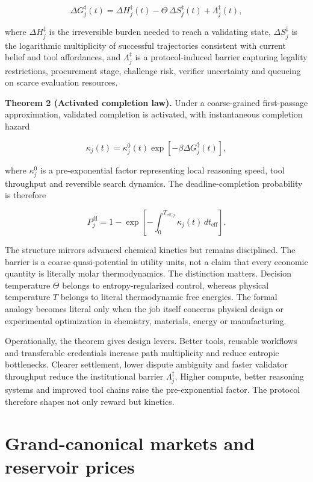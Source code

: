 \[
\Delta G_j^{\ddagger}(t) = \Delta H_j^{\ddagger}(t) - \Theta\,\Delta S_j^{\ddagger}(t) + \Lambda_j^{\ddagger}(t),
\]

where \(\Delta H_j^{\ddagger}\) is the irreversible burden needed to
reach a validating state, \(\Delta S_j^{\ddagger}\) is the logarithmic
multiplicity of successful trajectories consistent with current belief
and tool affordances, and \(\Lambda_j^{\ddagger}\) is a protocol-induced
barrier capturing legality restrictions, procurement stage, challenge
risk, verifier uncertainty and queueing on scarce evaluation resources.

\textbf{Theorem 2 (Activated completion law).} Under a coarse-grained
first-passage approximation, validated completion is activated, with
instantaneous completion hazard

\[
\kappa_j(t) = \kappa_j^0(t)\exp[-\beta\Delta G_j^{\ddagger}(t)],
\]

where \(\kappa_j^0\) is a pre-exponential factor representing local
reasoning speed, tool throughput and reversible search dynamics. The
deadline-completion probability is therefore

\[
P_j^{\mathrm{dl}} = 1 - \exp\left[-\int_0^{T_{\mathrm{eff},j}} \kappa_j(t)\,dt_{\mathrm{eff}}\right].
\]

The structure mirrors advanced chemical kinetics but remains
disciplined. The barrier is a coarse quasi-potential in utility units,
not a claim that every economic quantity is literally molar
thermodynamics. The distinction matters. Decision temperature \(\Theta\)
belongs to entropy-regularized control, whereas physical temperature
\(T\) belongs to literal thermodynamic free energies. The formal analogy
becomes literal only when the job itself concerns physical design or
experimental optimization in chemistry, materials, energy or
manufacturing.

Operationally, the theorem gives design levers. Better tools, reusable
workflows and transferable credentials increase path multiplicity and
reduce entropic bottlenecks. Clearer settlement, lower dispute ambiguity
and faster validator throughput reduce the institutional barrier
\(\Lambda_j^{\ddagger}\). Higher compute, better reasoning systems and
improved tool chains raise the pre-exponential factor. The protocol
therefore shapes not only reward but kinetics.

\section{Grand-canonical markets and reservoir
prices}\label{grand-canonical-markets-and-reservoir-prices}

